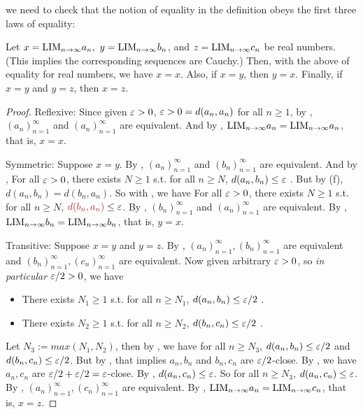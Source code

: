 \begin{note}
we need to check that the notion of equality in the definition obeys the first three laws of
equality:
\end{note}

\begin{proposition}  \label{prop 5.3.3}
Let \(x = \text{LIM}_{n \to \infty} a_n,\ y = \text{LIM}_{n \to \infty} b_n\), and \(z = \text{LIM}_{n \to \infty} c_n\) be real numbers.
(This implies the corresponding sequences are Cauchy.)
Then, with the above  of equality for real numbers, we have \(x = x\).
Also, if \(x = y\), then \(y = x\).
Finally, if \(x = y\) and \(y = z\), then \(x = z\).
\end{proposition}

\begin{proof}
Reflexive: Since given \(\varepsilon > 0\), \(\varepsilon > 0 = d(a_n, a_n)\) for all \(n \ge 1\), by , \((a_n)_{n = 1}^{\infty}\) and \((a_n)_{n = 1}^{\infty}\) are equivalent.
And by , \(\text{LIM}_{n \to \infty} a_n = \text{LIM}_{n \to \infty} a_n\), that is, \(x = x\).

Symmetric: Suppose \(x = y\).
By , \((a_n)_{n = 1}^{\infty}\) and \((b_n)_{n = 1}^{\infty}\) are equivalent.
And by , For all \(\varepsilon > 0\), there exists \(N \ge 1\) s.t. for all \(n \ge N\), \(d(a_n, b_n) \le \varepsilon\) .
But by (f), \(d(a_n, b_n) = d(b_n, a_n)\).
So with , we have For all \(\varepsilon > 0\), there exists \(N \ge 1\) s.t. for all \(n \ge N\), \(\MAROON{d(b_n, a_n)} \le \varE\).
By , \((b_n)_{n = 1}^{\infty}\) and \((a_n)_{n = 1}^{\infty}\) are equivalent.
By , \(\text{LIM}_{n \to \infty} b_n = \text{LIM}_{n \to \infty} b_n\), that is, \(y = x\).

Transitive: Suppose \(x = y\) and \(y = z\).
By , \((a_n)_{n = 1}^{\infty}, (b_n)_{n = 1}^{\infty}\) are equivalent and \((b_n)_{n = 1}^{\infty}, (c_n)_{n = 1}^{\infty}\) are equivalent.
Now given arbitrary \(\varepsilon > 0 \), so \emph{in particular \(\varepsilon/2 > 0\)}, we have
\begin{itemize}
    \item There exists \(N_1 \ge 1\) s.t. for all \(n \ge N_1\), \(d(a_n, b_n) \le \varepsilon/2\) .
    \item There exists \(N_2 \ge 1\) s.t. for all \(n \ge N_2\), \(d(b_n, c_n) \le \varepsilon/2\) .
\end{itemize}
Let \(N_3 := max(N_1, N_2)\), then by , we have for all \(n \ge N_3\), \(d(a_n, b_n) \le \varepsilon/2\) and \(d(b_n, c_n) \le \varepsilon/2\).
But by , that implies \(a_n, b_n\) and \(b_n, c_n\) are \(\varepsilon/2\)-close.
By , we have \(a_n, c_n\) are \(\varepsilon/2 + \varepsilon/2 = \varepsilon\)-close.
By , \(d(a_n, c_n) \le \varepsilon\).
So for all \(n \ge N_3\), \(d(a_n, c_n) \le \varepsilon\).
By , \((a_n)_{n = 1}^{\infty}, (c_n)_{n = 1}^{\infty}\) are equivalent.
By , \(\text{LIM}_{n \to \infty} a_n = \text{LIM}_{n \to \infty} c_n\), that is, \(x = z\).
\end{proof}


